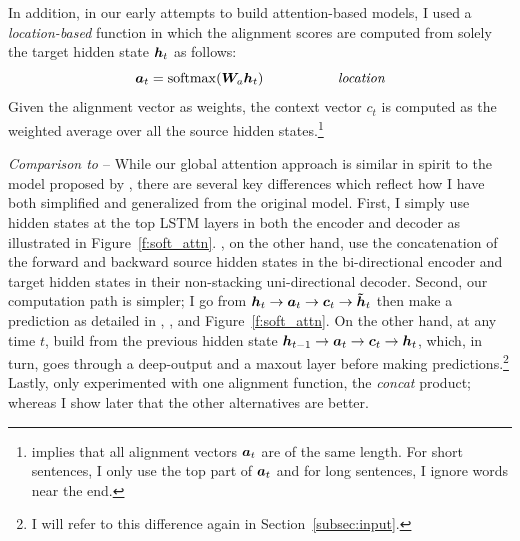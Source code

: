 In addition, in our early attempts to build attention-based models, I used
a {\it location-based} function in which the alignment scores are
computed from solely the target hidden state $\mbox{\boldmath{$h$}}_{t}$ as
follows:
\begin{equation}
\mbox{\boldmath{$a$}}_{t} = \operatorname{softmax}(\bm{W}_{a}\mbox{\boldmath{$h$}}_{t}) \mbox{ } \mbox{ } \mbox{ } \mbox{ } \mbox{ } \mbox{ } \mbox{ } \mbox{ } \mbox{ } \mbox{ } \mbox{ } \mbox{ } \mbox{ } \mbox{ } \mbox{ } \mbox{ } \mbox{{\it location}}
\label{e:location}
\end{equation}
Given the alignment vector as weights, the
context vector $c_t$ is computed as the  weighted average over all the source hidden states.\footnote{ implies that
all alignment vectors $\mbox{\boldmath{$a$}}_{t}$ are of the same length. For short sentences, I only
use the top part of $\mbox{\boldmath{$a$}}_{t}$ and for long sentences, I ignore words near the end.}

\textit{Comparison to \cite{bog15}} --
While our global attention approach is similar in spirit to the model proposed
by , there are several key differences which reflect how I have
both simplified and generalized from the original model. First, I simply use
hidden states at the top LSTM layers in both the encoder and decoder as
illustrated in Figure~\ref{f:soft_attn}. , on the other hand,
use the concatenation of the forward and backward source 
hidden states in the bi-directional encoder and target hidden
states in their non-stacking uni-directional decoder. Second, our computation
path is simpler; I go from $\mbox{\boldmath{$h$}}_{t} \rightarrow \mbox{\boldmath{$a$}}_{t} \rightarrow \mbox{\boldmath{$c$}}_{t} \rightarrow
\mbox{\boldmath{$\tilde{h}$}}_{t}$ then make a prediction as detailed in , , and
Figure~\ref{f:soft_attn}. On the other hand, at any time $t$,  build from the previous hidden state $\bm{h}_{t-1} \rightarrow \mbox{\boldmath{$a$}}_{t} \rightarrow \mbox{\boldmath{$c$}}_{t} \rightarrow \mbox{\boldmath{$h$}}_{t}$, which, in turn, goes through a deep-output and a maxout layer before making predictions.\footnote{I will refer to this difference again in Section~\ref{subsec:input}.} Lastly,  only experimented with one alignment function, the {\it concat} product; whereas I show later that the other alternatives are better.


